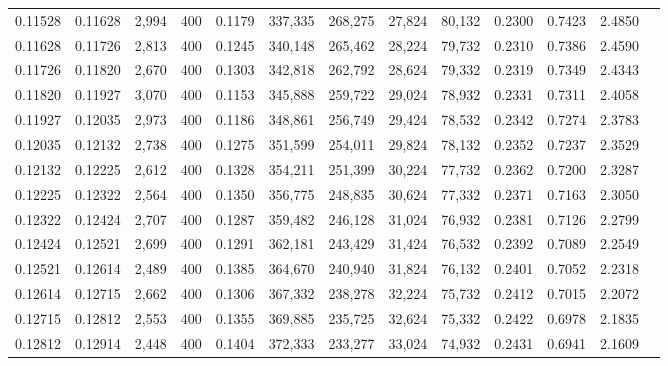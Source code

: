 \begin{tabular}{rrrrrrrrrrrrr}
0.11528 & 0.11628 &  2,994 & 400 &                                     0.1179 & 337,335 & 268,275 &  27,824 &  80,132 & 0.2300 & 0.7423 & 2.4850 \\
0.11628 & 0.11726 &  2,813 & 400 &                                     0.1245 & 340,148 & 265,462 &  28,224 &  79,732 & 0.2310 & 0.7386 & 2.4590 \\
0.11726 & 0.11820 &  2,670 & 400 &                                     0.1303 & 342,818 & 262,792 &  28,624 &  79,332 & 0.2319 & 0.7349 & 2.4343 \\
0.11820 & 0.11927 &  3,070 & 400 &                                     0.1153 & 345,888 & 259,722 &  29,024 &  78,932 & 0.2331 & 0.7311 & 2.4058 \\
0.11927 & 0.12035 &  2,973 & 400 &                                     0.1186 & 348,861 & 256,749 &  29,424 &  78,532 & 0.2342 & 0.7274 & 2.3783 \\
0.12035 & 0.12132 &  2,738 & 400 &                                     0.1275 & 351,599 & 254,011 &  29,824 &  78,132 & 0.2352 & 0.7237 & 2.3529 \\
0.12132 & 0.12225 &  2,612 & 400 &                                     0.1328 & 354,211 & 251,399 &  30,224 &  77,732 & 0.2362 & 0.7200 & 2.3287 \\
0.12225 & 0.12322 &  2,564 & 400 &                                     0.1350 & 356,775 & 248,835 &  30,624 &  77,332 & 0.2371 & 0.7163 & 2.3050 \\
0.12322 & 0.12424 &  2,707 & 400 &                                     0.1287 & 359,482 & 246,128 &  31,024 &  76,932 & 0.2381 & 0.7126 & 2.2799 \\
0.12424 & 0.12521 &  2,699 & 400 &                                     0.1291 & 362,181 & 243,429 &  31,424 &  76,532 & 0.2392 & 0.7089 & 2.2549 \\
0.12521 & 0.12614 &  2,489 & 400 &                                     0.1385 & 364,670 & 240,940 &  31,824 &  76,132 & 0.2401 & 0.7052 & 2.2318 \\
0.12614 & 0.12715 &  2,662 & 400 &                                     0.1306 & 367,332 & 238,278 &  32,224 &  75,732 & 0.2412 & 0.7015 & 2.2072 \\
0.12715 & 0.12812 &  2,553 & 400 &                                     0.1355 & 369,885 & 235,725 &  32,624 &  75,332 & 0.2422 & 0.6978 & 2.1835 \\
0.12812 & 0.12914 &  2,448 & 400 &                                     0.1404 & 372,333 & 233,277 &  33,024 &  74,932 & 0.2431 & 0.6941 & 2.1609 \\

\end{tabular}

